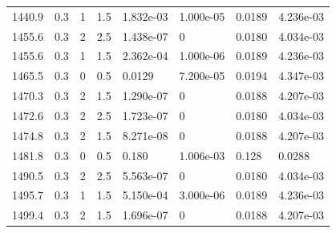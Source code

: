 \documentclass[preview]{standalone}
\begin{document}
{{{{\begin{tabular}{L{1.2cm}C{1.2cm} C{0.3cm}C{0.5cm} C{1.4cm}C{1.4cm} C{1.4cm}C{1.4cm}}
  1440.9  &   0.3  & 1     & 1.5 &  1.832e-03  & 1.000e-05  & 0.0189 &  4.236e-03   \\ 
  1455.6  &   0.3  & 2     & 2.5 &  1.438e-07  & 0  & 0.0180 &  4.034e-03   \\ 
  1455.6  &   0.3  & 1     & 1.5 &  2.362e-04  & 1.000e-06  & 0.0189 &  4.236e-03   \\ 
  1465.5  &   0.3  & 0     & 0.5 &  0.0129  & 7.200e-05  & 0.0194 &  4.347e-03   \\ 
  1470.3  &   0.3  & 2     & 1.5 &  1.290e-07  & 0  & 0.0188 &  4.207e-03   \\ 
  1472.6  &   0.3  & 2     & 2.5 &  1.723e-07  & 0  & 0.0180 &  4.034e-03   \\ 
  1474.8  &   0.3  & 2     & 1.5 &  8.271e-08  & 0  & 0.0188 &  4.207e-03   \\ 
  1481.8  &   0.3  & 0     & 0.5 &  0.180  & 1.006e-03  & 0.128 &  0.0288   \\ 
  1490.5  &   0.3  & 2     & 2.5 &  5.563e-07  & 0  & 0.0180 &  4.034e-03   \\ 
  1495.7  &   0.3  & 1     & 1.5 &  5.150e-04  & 3.000e-06  & 0.0189 &  4.236e-03   \\ 
  1499.4  &   0.3  & 2     & 1.5 &  1.696e-07  & 0  & 0.0188 &  4.207e-03   \\ 
\hline 
\end{tabular} 

}}}}
\end{document}
